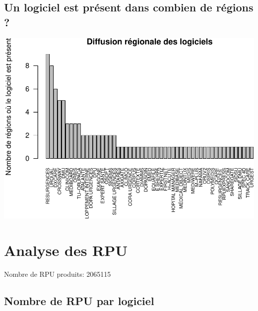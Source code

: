 \documentclass[]{article}
\begin{document}
\subsection{Un logiciel est présent dans combien de régions
?}\label{un-logiciel-est-present-dans-combien-de-regions}

\includegraphics{septembre2015_files/figure-latex/unnamed-chunk-12-1.pdf}

\section{Analyse des RPU}\label{analyse-des-rpu}

Nombre de RPU produits: 2065115

\subsection{Nombre de RPU par
logiciel}\label{nombre-de-rpu-par-logiciel}
\end{document}
